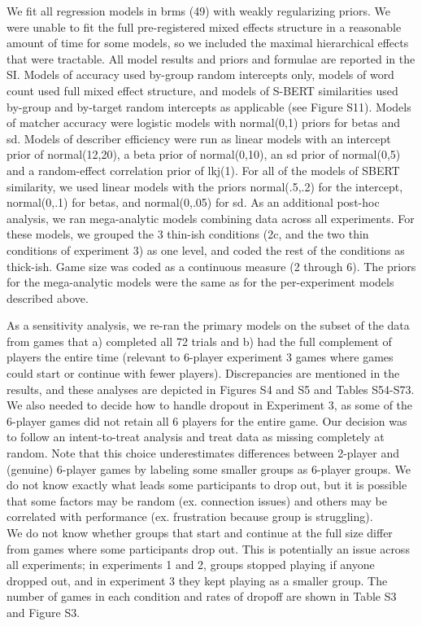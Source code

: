\documentclass[9pt,twocolumn,twoside]{pnas-new}
\begin{document}
{We fit all regression models in brms (49) with weakly regularizing
priors. We were unable to fit the full pre-registered mixed effects
structure in a reasonable amount of time for some models, so we included
the maximal hierarchical effects that were tractable. All model results
and priors and formulae are reported in the SI. Models of accuracy used
by-group random intercepts only, models of word count used full mixed
effect structure, and models of S-BERT similarities used by-group and
by-target random intercepts as applicable (see Figure S11). Models of
matcher accuracy were logistic models with normal(0,1) priors for betas
and sd. Models of describer efficiency were run as linear models with an
intercept prior of normal(12,20), a beta prior of normal(0,10), an sd
prior of normal(0,5) and a random-effect correlation prior of lkj(1).
For all of the models of SBERT similarity, we used linear models with
the priors normal(.5,.2) for the intercept, normal(0,.1) for betas, and
normal(0,.05) for sd. As an additional post-hoc analysis, we ran
mega-analytic models combining data across all experiments. For these
models, we grouped the 3 thin-ish conditions (2c, and the two thin
conditions of experiment 3) as one level, and coded the rest of the
conditions as thick-ish. Game size was coded as a continuous measure (2
through 6). The priors for the mega-analytic models were the same as for
the per-experiment models described above.

As a sensitivity analysis, we re-ran the primary models on the subset of
the data from games that a) completed all 72 trials and b) had the full
complement of players the entire time (relevant to 6-player experiment 3
games where games could start or continue with fewer players).
Discrepancies are mentioned in the results, and these analyses are
depicted in Figures S4 and S5 and Tables S54-S73. We also needed to
decide how to handle dropout in Experiment 3, as some of the 6-player
games did not retain all 6 players for the entire game. Our decision was
to follow an intent-to-treat analysis and treat data as missing
completely at random. Note that this choice underestimates differences
between 2-player and (genuine) 6-player games by labeling some smaller
groups as 6-player groups. We do not know exactly what leads some
participants to drop out, but it is possible that some factors may be
random (ex. connection issues) and others may be correlated with
performance (ex. frustration because group is struggling).\\
We do not know whether groups that start and continue at the full size
differ from games where some participants drop out. This is potentially
an issue across all experiments; in experiments 1 and 2, groups stopped
playing if anyone dropped out, and in experiment 3 they kept playing as
a smaller group. The number of games in each condition and rates of
dropoff are shown in Table S3 and Figure S3.
}
\end{document}
